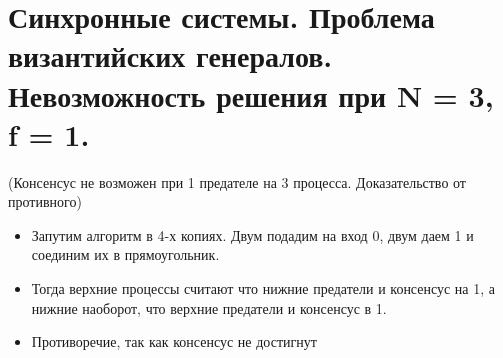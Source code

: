 \section{Синхронные системы. Проблема византийских генералов. Невозможность решения при N = 3, f = 1.}

\begin{algorithm} (Консенсус не возможен при 1 предателе на 3 процесса. Доказательство от противного)
    \begin{itemize}
    \item Запутим алгоритм в 4-х копиях. Двум подадим на вход 0, двум даем 1 и соединим их в прямоугольник.
    \item Тогда верхние процессы считают что нижние предатели и консенсус на 1, а нижние наоборот, что верхние предатели и консенсус в 1.
    \item Противоречие, так как консенсус не достигнут
    \end{itemize}
\end{algorithm}
